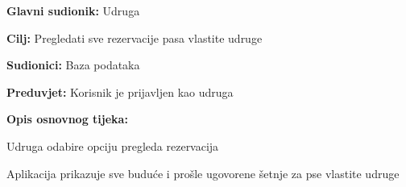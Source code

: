 					
					
					
					
					\noindent {}
					\begin{packed_item}
	
						\item \textbf{Glavni sudionik:} Udruga
						\item  \textbf{Cilj:} Pregledati sve rezervacije pasa vlastite udruge
						\item  \textbf{Sudionici:} Baza podataka
						\item  \textbf{Preduvjet:} Korisnik je prijavljen kao udruga
						\item  \textbf{Opis osnovnog tijeka:}
						
						\item[] \begin{packed_enum}
							\item Udruga odabire opciju pregleda rezervacija
							\item Aplikacija prikazuje sve buduće i prošle ugovorene šetnje za pse vlastite udruge
						\end{packed_enum}
					\end{packed_item}
					
